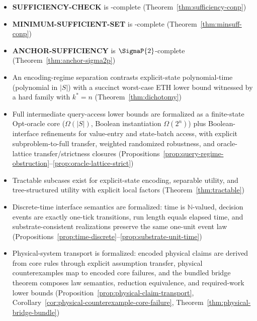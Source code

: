 \begin{itemize}
\item \textbf{SUFFICIENCY-CHECK} is \coNP-complete (Theorem~\ref{thm:sufficiency-conp})
\item \textbf{MINIMUM-SUFFICIENT-SET} is \coNP-complete (Theorem~\ref{thm:minsuff-conp})
\item \textbf{ANCHOR-SUFFICIENCY} is $\SigmaP{2}$-complete (Theorem~\ref{thm:anchor-sigma2p})
\item An encoding-regime separation contrasts explicit-state polynomial-time (polynomial in $|S|$) with a succinct worst-case ETH lower bound witnessed by a hard family with $k^*=n$ (Theorem~\ref{thm:dichotomy})
\item Full intermediate query-access lower bounds are formalized as a finite-state Opt-oracle core ($\Omega(|S|)$, Boolean instantiation $\Omega(2^n)$) plus Boolean-interface refinements for value-entry and state-batch access, with explicit subproblem-to-full transfer, weighted randomized robustness, and oracle-lattice transfer/strictness closures (Propositions~\ref{prop:query-regime-obstruction}--\ref{prop:oracle-lattice-strict})
\item Tractable subcases exist for explicit-state encoding, separable utility, and tree-structured utility with explicit local factors (Theorem~\ref{thm:tractable})
\item Discrete-time interface semantics are formalized: time is $\mathbb{N}$-valued, decision events are exactly one-tick transitions, run length equals elapsed time, and substrate-consistent realizations preserve the same one-unit event law (Propositions~\ref{prop:time-discrete}--\ref{prop:substrate-unit-time})
\item Physical-system transport is formalized: encoded physical claims are derived from core rules through explicit assumption transfer, physical counterexamples map to encoded core failures, and the bundled bridge theorem composes law semantics, reduction equivalence, and required-work lower bounds (Proposition~\ref{prop:physical-claim-transport}, Corollary~\ref{cor:physical-counterexample-core-failure}, Theorem~\ref{thm:physical-bridge-bundle})
\end{itemize}

